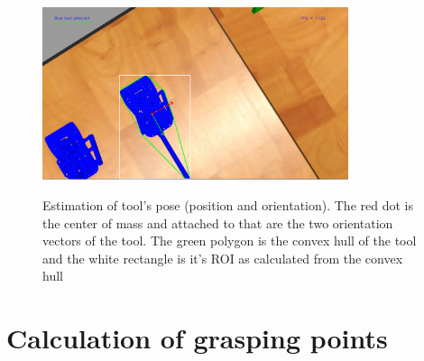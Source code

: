 \begin{center}
\begin{figure}[H]
\centering
\includegraphics[width=0.8\textwidth]{images/tool-pose.png}\\
\caption{Estimation of tool's pose (position and orientation). The red dot is the center of mass and attached to that are the two orientation vectors of the tool. The green polygon is the convex hull of the tool 
and the white rectangle is it's ROI as calculated from the convex hull}
\end{figure}
\end{center}

\section{Calculation of grasping points}

